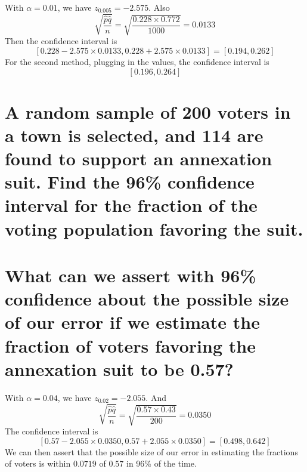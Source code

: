 \documentclass[answers]{exam}
\begin{document}
\begin{questions}

\begin{solution}
    With $\alpha = 0.01$, we have $z_{0.005} = -2.575$. Also
    $$\sqrt{\frac{\hat p\hat q}{n}} = \sqrt{\frac{0.228\times0.772}{1000}} = 0.0133$$
    Then the confidence interval is
    $$[0.228 - 2.575\times0.0133, 0.228 + 2.575\times0.0133] = [0.194, 0.262]$$
    For the second method, plugging in the values, the confidence interval is
    $$[0.196, 0.264]$$
\end{solution}

\question{}

\begin{parts}
    \part{A random sample of 200 voters in a town is selected, and 114 are found to support an annexation suit. Find the 96\% confidence interval for the fraction of the voting population favoring the suit.}
    \part{What can we assert with 96\% confidence about the possible size of our error if we estimate the fraction of voters favoring the annexation suit to be 0.57?}
\end{parts}

\begin{solution}
    With $\alpha = 0.04$, we have $z_{0.02} = -2.055$. And
    $$\sqrt{\frac{\hat p\hat q}{n}} = \sqrt{\frac{0.57\times0.43}{200}} = 0.0350$$
    The confidence interval is
    $$[0.57 - 2.055\times0.0350, 0.57 + 2.055\times0.0350] = [0.498, 0.642]$$
    We can then assert that the possible size of our error in estimating the fractions of voters is within $0.0719$ of $0.57$ in 96\% of the time.
\end{solution}


\begin{parts}

\end{parts}
\end{questions}
\end{document}

